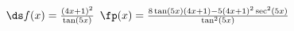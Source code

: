 {$\ds f(x) = \frac{(4x+1)^2}{\tan(5x)}$}
{$\fp(x) = \frac{8\tan(5x)(4x+1)-5(4x+1)^2\sec^2(5x)}{\tan^2(5x)}$
}